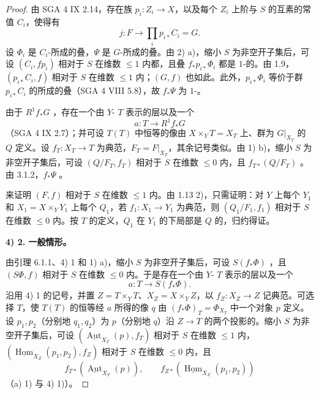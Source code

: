\begin{proof}
由 SGA 4 IX 2.14，存在族 $p_i:Z_i\to X$，以及每个 $Z_i$ 上阶与 $S$ 的互素的常值 $C_i$，使得有
\[j:F\longrightarrow\prod_i p_{i*}C_i=G.\]
设 $\Phi_i$ 是 $C_i$-所成的叠，$\Psi$ 是 $G$-所成的叠。由 2) a)，缩小 $S$ 为非空开子集后，可设 $(C_i,fp_i)$ 相对于 $S$ 在维数 $\leq1$ 内都，且叠 $f_*p_{i*}\Phi_i$ 都是 $1$-的。由 1.9，$(p_{i*}C_i,f)$ 相对于 $S$ 在维数 $\leq1$ 内；$(G,f)$ 也如此。此外，$p_{i*}\Phi_i$ 等价于群 $p_{i*}C_i$ 的所成的叠（SGA 4 VIII 5.8），故 $f_*\Psi$ 为 $1$-。

由于 $R^1f_*G$ ，存在一个由 $Y$- $T$ 表示的层以及一个
\[a:T\longrightarrow R^1f_*G\]
（SGA 4 IX 2.7）；并可设 $T(T)$ 中恒等的像由 $X\times_Y T=X_T$ 上、群为 $G|_{X_T}$ 的 $Q$ 定义。设 $f_T:X_T\to T$ 为典范，$F_T=F|_{X_T}$，其余记号类似。由 1) b)，缩小 $S$ 为非空开子集后，可设 $(Q/F_T,f_T)$ 相对于 $S$ 在维数 $\leq0$ 内，且 $f_{T*}(Q/F_T)$ 。由 3.1.2，$f_*\Psi$ 。

来证明 $(F,f)$ 相对于 $S$ 在维数 $\leq1$ 内。由 1.13 2)，只需证明：对 $Y$ 上每个 $Y_1$ 和 $X_1=X\times_Y Y_1$ 上每个 $Q_1$，若 $f_1:X_1\to Y_1$ 为典范，则 $(Q_1/F_1,f_1)$ 相对于 $S$ 在维数 $\leq0$ 内。按 $T$ 的定义，$Q_1$ 在 $Y_1$ 的下局部是 $Q$ 的，归约得证。

\textbf{4) 2. 一般情形。}

由引理 6.1.1、4) 1 和 1) a)，缩小 $S$ 为非空开子集后，可设 $S(f_*\Phi)$ ，且 $(S\Phi,f)$ 相对于 $S$ 在维数 $\leq0$ 内。于是存在一个由 $Y$- $T$ 表示的层以及一个
\[a:T\longrightarrow S(f_*\Phi).\]
沿用 4) 1 的记号，并置 $Z=T\times_Y T$、$X_Z=X\times_Y Z$，以 $f_Z:X_Z\to Z$ 记典范。可选择 $T$，使 $T(T)$ 的恒等经 $a$ 所得的像 $q$ 由 $(f_*\Phi)_T=\Phi_{X_T}$ 中一个对象 $p$ 定义。设 $p_1,p_2$（分别地 $q_1,q_2$）为 $p$（分别地 $q$）沿 $Z\to T$ 的两个投影的。缩小 $S$ 为非空开子集后，可设 $(\underline{\operatorname{Aut}}_{X_T}(p),f_T)$ 相对于 $S$ 在维数 $\leq1$ 内，$(\underline{\operatorname{Hom}}_{X_Z}(p_1,p_2),f_Z)$ 相对于 $S$ 在维数 $\leq0$ 内，且
\[
f_{T*}(\underline{\operatorname{Aut}}_{X_T}(p)),\qquad
f_{Z*}(\underline{\operatorname{Hom}}_{X_Z}(p_1,p_2))
\]
（a) 1) 与 4) 1)）。


\end{proof}

